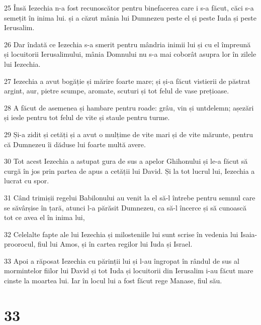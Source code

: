\par 25 Însă Iezechia n-a fost recunoscător pentru binefacerea care i s-a făcut, căci s-a semețit în inima lui. și a căzut mânia lui Dumnezeu peste el și peste Iuda și peste Ierusalim.
\par 26 Dar îndată ce Iezechia s-a smerit pentru mândria inimii lui și cu el împreună și locuitorii Ierusalimului, mânia Domnului nu s-a mai coborât asupra lor în zilele lui Iezechia.
\par 27 Iezechia a avut bogăție și mărire foarte mare; și și-a făcut vistierii de păstrat argint, aur, pietre scumpe, aromate, scuturi și tot felul de vase prețioase.
\par 28 A făcut de asemenea și hambare pentru roade: grâu, vin și untdelemn; așezări și iesle pentru tot felul de vite și staule pentru turme.
\par 29 Și-a zidit și cetăți și a avut o mulțime de vite mari și de vite mărunte, pentru că Dumnezeu îi dăduse lui foarte multă avere.
\par 30 Tot acest Iezechia a astupat gura de sus a apelor Ghihonului și le-a făcut să curgă în jos prin partea de apus a cetății lui David. Și la tot lucrul lui, Iezechia a lucrat cu spor.
\par 31 Când trimișii regelui Babilonului au venit la el să-l întrebe pentru semnul care se săvârșise în țară, atunci l-a părăsit Dumnezeu, ca să-l încerce și să cunoască tot ce avea el în inima lui,
\par 32 Celelalte fapte ale lui Iezechia și milosteniile lui sunt scrise în vedenia lui Isaia-proorocul, fiul lui Amos, și în cartea regilor lui Iuda și Israel.
\par 33 Apoi a răposat Iezechia cu părinții lui și l-au îngropat în rândul de sus al mormintelor fiilor lui David și tot Iuda și locuitorii din Ierusalim i-au făcut mare cinste la moartea lui. Iar în locul lui a fost făcut rege Manase, fiul său.

\chapter{33}

